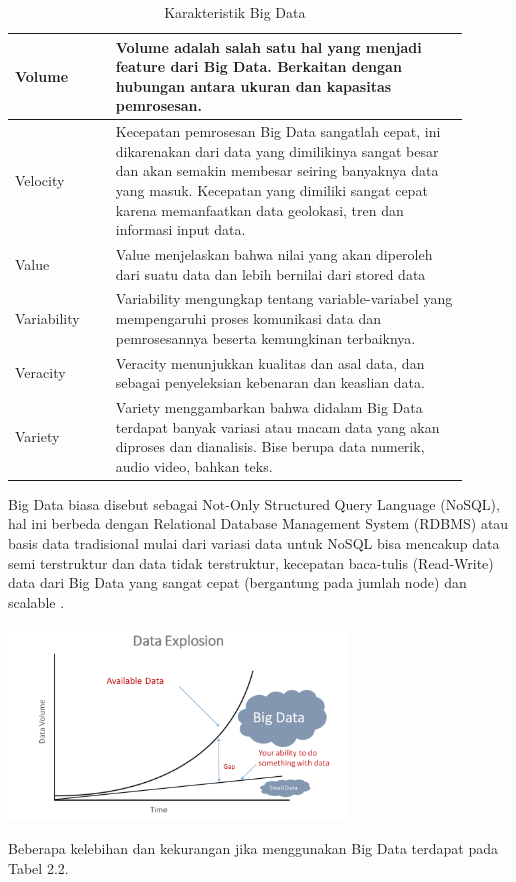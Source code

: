 \documentclass[12pt,a4paper]{report}
\begin{document}
	\begin{table}[h]
		\centering
		\caption{Karakteristik Big Data \cite{Moura2015}\cite{Schaafsma2020}}
		\label{tab:my_label}
		\begin{tabular}{|p{0.2\linewidth} | p{0.7\linewidth}|} 
			\hline
			Volume\centering & Volume adalah salah satu hal yang menjadi feature dari Big Data. Berkaitan dengan hubungan antara ukuran dan kapasitas pemrosesan. \\ \hline
			Velocity\centering & Kecepatan pemrosesan Big Data sangatlah cepat, ini dikarenakan dari data yang dimilikinya sangat besar dan akan semakin membesar seiring banyaknya data yang masuk. Kecepatan yang dimiliki sangat cepat karena memanfaatkan data geolokasi, tren dan informasi input data. \\ \hline
			Value\centering & Value menjelaskan bahwa nilai yang akan diperoleh dari suatu data dan lebih bernilai dari stored data \\ \hline
			Variability\centering & Variability mengungkap tentang variable-variabel yang mempengaruhi proses komunikasi data dan pemrosesannya beserta kemungkinan terbaiknya. \\ \hline
			Veracity\centering & Veracity menunjukkan kualitas dan asal data, dan sebagai penyeleksian kebenaran dan keaslian data. \\ \hline
			Variety\centering & Variety menggambarkan bahwa didalam Big Data terdapat banyak variasi atau macam data yang akan diproses dan dianalisis. Bise berupa data numerik, audio video, bahkan teks. \\ \hline
		\end{tabular}
	\end{table}

	Big Data biasa disebut sebagai Not-Only Structured Query Language (NoSQL), hal ini berbeda dengan Relational Database Management System (RDBMS) atau basis data tradisional mulai dari variasi data untuk NoSQL bisa mencakup data semi terstruktur dan data tidak terstruktur, kecepatan baca-tulis (Read-Write) data dari Big Data yang sangat cepat (bergantung pada jumlah node) dan scalable \cite{Fadillah2020}.
	\begin{center}
	\includegraphics[width=9cm]{gambar/perform.png}
	\end{center}
	Beberapa kelebihan dan kekurangan jika menggunakan Big Data terdapat pada Tabel 2.2.
	
\end{document}
